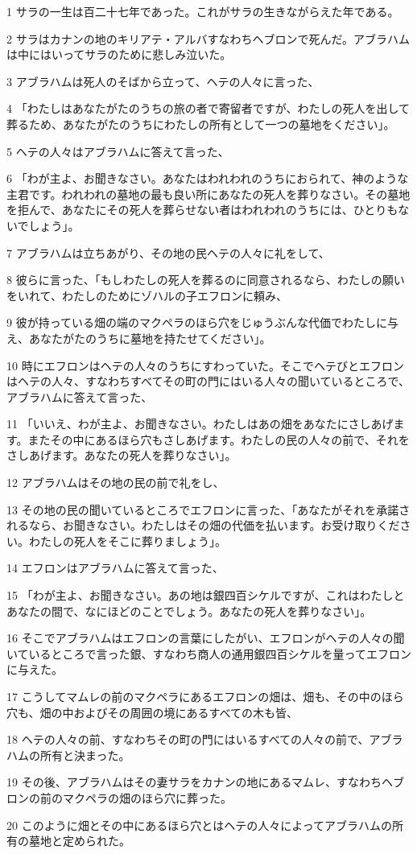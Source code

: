 \par 1 サラの一生は百二十七年であった。これがサラの生きながらえた年である。
\par 2 サラはカナンの地のキリアテ・アルバすなわちヘブロンで死んだ。アブラハムは中にはいってサラのために悲しみ泣いた。
\par 3 アブラハムは死人のそばから立って、ヘテの人々に言った、
\par 4 「わたしはあなたがたのうちの旅の者で寄留者ですが、わたしの死人を出して葬るため、あなたがたのうちにわたしの所有として一つの墓地をください」。
\par 5 ヘテの人々はアブラハムに答えて言った、
\par 6 「わが主よ、お聞きなさい。あなたはわれわれのうちにおられて、神のような主君です。われわれの墓地の最も良い所にあなたの死人を葬りなさい。その墓地を拒んで、あなたにその死人を葬らせない者はわれわれのうちには、ひとりもないでしょう」。
\par 7 アブラハムは立ちあがり、その地の民ヘテの人々に礼をして、
\par 8 彼らに言った、「もしわたしの死人を葬るのに同意されるなら、わたしの願いをいれて、わたしのためにゾハルの子エフロンに頼み、
\par 9 彼が持っている畑の端のマクペラのほら穴をじゅうぶんな代価でわたしに与え、あなたがたのうちに墓地を持たせてください」。
\par 10 時にエフロンはヘテの人々のうちにすわっていた。そこでヘテびとエフロンはヘテの人々、すなわちすべてその町の門にはいる人々の聞いているところで、アブラハムに答えて言った、
\par 11 「いいえ、わが主よ、お聞きなさい。わたしはあの畑をあなたにさしあげます。またその中にあるほら穴もさしあげます。わたしの民の人々の前で、それをさしあげます。あなたの死人を葬りなさい」。
\par 12 アブラハムはその地の民の前で礼をし、
\par 13 その地の民の聞いているところでエフロンに言った、「あなたがそれを承諾されるなら、お聞きなさい。わたしはその畑の代価を払います。お受け取りください。わたしの死人をそこに葬りましょう」。
\par 14 エフロンはアブラハムに答えて言った、
\par 15 「わが主よ、お聞きなさい。あの地は銀四百シケルですが、これはわたしとあなたの間で、なにほどのことでしょう。あなたの死人を葬りなさい」。
\par 16 そこでアブラハムはエフロンの言葉にしたがい、エフロンがヘテの人々の聞いているところで言った銀、すなわち商人の通用銀四百シケルを量ってエフロンに与えた。
\par 17 こうしてマムレの前のマクペラにあるエフロンの畑は、畑も、その中のほら穴も、畑の中およびその周囲の境にあるすべての木も皆、
\par 18 ヘテの人々の前、すなわちその町の門にはいるすべての人々の前で、アブラハムの所有と決まった。
\par 19 その後、アブラハムはその妻サラをカナンの地にあるマムレ、すなわちヘブロンの前のマクペラの畑のほら穴に葬った。
\par 20 このように畑とその中にあるほら穴とはヘテの人々によってアブラハムの所有の墓地と定められた。

